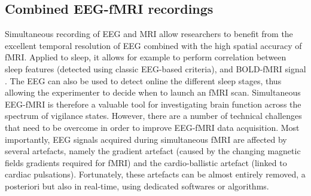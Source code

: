 \subsection{Combined EEG-fMRI recordings}
\label{sec:fmri:rs:eeg-fmri}

Simultaneous recording of EEG and MRI allow researchers to benefit from the excellent temporal resolution of EEG combined with the high spatial accuracy of fMRI. Applied to sleep, it allows for example to perform correlation between sleep features (detected using classic EEG-based criteria), and BOLD-fMRI signal \citep{duyn_eeg-fmri_2012}. The EEG can also be used to detect online the different sleep stages, thus allowing the experimenter to decide when to launch an fMRI scan. Simultaneous EEG-fMRI is therefore a valuable tool for investigating brain function across the spectrum of vigilance states.
However, there are a number of technical challenges that need to be overcome in order to improve EEG-fMRI data acquisition. Most importantly, EEG signals acquired during simultaneous fMRI are affected by several artefacts, namely the gradient artefact (caused by the changing magnetic fields gradients required for fMRI) and the cardio-ballistic artefact (linked to cardiac pulsations). Fortunately, these artefacts can be almost entirely removed, a posteriori but also in real-time, using dedicated softwares or algorithms.
